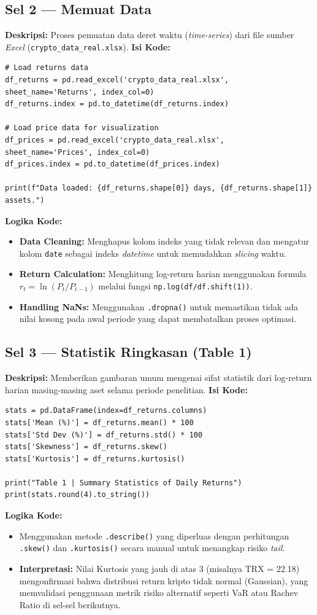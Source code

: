 \documentclass[12pt, a4paper]{article}
\begin{document}
\subsection{Sel 2 — Memuat Data}
\textbf{Deskripsi:} Proses pemuatan data deret waktu (\textit{time-series}) dari file sumber \textit{Excel} (\texttt{crypto\_data\_real.xlsx}).
\textbf{Isi Kode:}
\begin{lstlisting}
# Load returns data
df_returns = pd.read_excel('crypto_data_real.xlsx', sheet_name='Returns', index_col=0)
df_returns.index = pd.to_datetime(df_returns.index)

# Load price data for visualization
df_prices = pd.read_excel('crypto_data_real.xlsx', sheet_name='Prices', index_col=0)
df_prices.index = pd.to_datetime(df_prices.index)

print(f"Data loaded: {df_returns.shape[0]} days, {df_returns.shape[1]} assets.")
\end{lstlisting}
\textbf{Logika Kode:}
\begin{itemize}
    \item \textbf{Data Cleaning:} Menghapus kolom indeks yang tidak relevan dan mengatur kolom \texttt{date} sebagai indeks \textit{datetime} untuk memudahkan \textit{slicing} waktu.
    \item \textbf{Return Calculation:} Menghitung log-return harian menggunakan formula $r_t = \ln(P_t / P_{t-1})$ melalui fungsi \texttt{np.log(df/df.shift(1))}.
    \item \textbf{Handling NaNs:} Menggunakan \texttt{.dropna()} untuk memastikan tidak ada nilai kosong pada awal periode yang dapat membatalkan proses optimasi.
\end{itemize}

\subsection{Sel 3 — Statistik Ringkasan (Table 1)}
\textbf{Deskripsi:} Memberikan gambaran umum mengenai sifat statistik dari log-return harian masing-masing aset selama periode penelitian.
\textbf{Isi Kode:}
\begin{lstlisting}
stats = pd.DataFrame(index=df_returns.columns)
stats['Mean (%)'] = df_returns.mean() * 100
stats['Std Dev (%)'] = df_returns.std() * 100
stats['Skewness'] = df_returns.skew()
stats['Kurtosis'] = df_returns.kurtosis()

print("Table 1 | Summary Statistics of Daily Returns")
print(stats.round(4).to_string())
\end{lstlisting}
\textbf{Logika Kode:} 
\begin{itemize}
    \item Menggunakan metode \texttt{.describe()} yang diperluas dengan perhitungan \texttt{.skew()} dan \texttt{.kurtosis()} secara manual untuk menangkap risiko \textit{tail}.
    \item \textbf{Interpretasi:} Nilai Kurtosis yang jauh di atas 3 (misalnya TRX = 22.18) mengonfirmasi bahwa distribusi return kripto tidak normal (Gaussian), yang memvalidasi penggunaan metrik risiko alternatif seperti VaR atau Rachev Ratio di sel-sel berikutnya.
\end{itemize}
\end{document}
